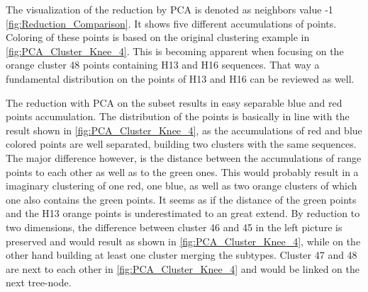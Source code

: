 The visualization of the reduction by \gls{PCA} is denoted as neighbors value -1 \autoref{fig:Reduction_Comparison}. It shows five different accumulations of points. Coloring of these points is based on the original clustering example in \autoref{fig:PCA_Cluster_Knee_4}. This is becoming apparent when focusing on the orange cluster 48 points containing H13 and H16 sequences. That way a fundamental distribution on the points of H13 and H16 can be reviewed as well. 
%

The reduction with \gls{PCA} on the subset results in easy separable blue and red points accumulation. The distribution of the points is basically in line with the result shown in \autoref{fig:PCA_Cluster_Knee_4}, as the accumulations of red and blue colored points are well separated, building two clusters with the same sequences. The major difference however, is the distance between the accumulations of range points to each other as well as to the green ones. This would probably result in a imaginary clustering of one red, one blue, as well as two orange clusters of which one also contains the green points. It seems as if the distance of the green points and the H13 orange points is underestimated to an great extend. By reduction to two dimensions, the difference between cluster 46 and 45 in the left picture is preserved and would result as shown in \autoref{fig:PCA_Cluster_Knee_4}, while on the other hand building at least one cluster merging the subtypes. Cluster 47 and 48 are next to each other in \autoref{fig:PCA_Cluster_Knee_4} and would be linked on the next tree-node.

